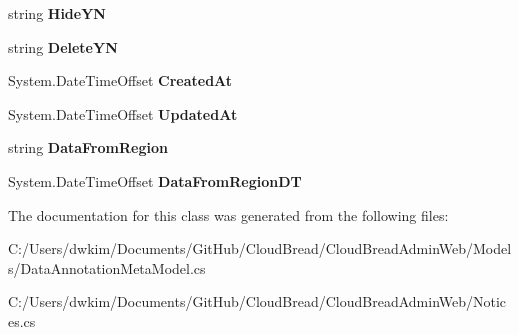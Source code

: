 \begin{DoxyCompactItemize}
\item 
string {\bfseries Hide\+YN}\hypertarget{a00168_af8b3dc1c1b42d845538dca5303f984c1}{}\label{a00168_af8b3dc1c1b42d845538dca5303f984c1}

\item 
string {\bfseries Delete\+YN}\hypertarget{a00168_a0f53b0c9e1b05d0b94e41bc536a2c6ee}{}\label{a00168_a0f53b0c9e1b05d0b94e41bc536a2c6ee}

\item 
System.\+Date\+Time\+Offset {\bfseries Created\+At}\hypertarget{a00168_ab0ebaecfed356e4ffe5c3273e348f50a}{}\label{a00168_ab0ebaecfed356e4ffe5c3273e348f50a}

\item 
System.\+Date\+Time\+Offset {\bfseries Updated\+At}\hypertarget{a00168_abc807992a04a424a9bdb722d4a222378}{}\label{a00168_abc807992a04a424a9bdb722d4a222378}

\item 
string {\bfseries Data\+From\+Region}\hypertarget{a00168_a2d4a3491ea227eb387b379e229e9a749}{}\label{a00168_a2d4a3491ea227eb387b379e229e9a749}

\item 
System.\+Date\+Time\+Offset {\bfseries Data\+From\+Region\+DT}\hypertarget{a00168_a83bd40ff691b789488961e2ce98b3e64}{}\label{a00168_a83bd40ff691b789488961e2ce98b3e64}

\end{DoxyCompactItemize}


The documentation for this class was generated from the following files\+:\begin{DoxyCompactItemize}
\item 
C\+:/\+Users/dwkim/\+Documents/\+Git\+Hub/\+Cloud\+Bread/\+Cloud\+Bread\+Admin\+Web/\+Models/Data\+Annotation\+Meta\+Model.\+cs\item 
C\+:/\+Users/dwkim/\+Documents/\+Git\+Hub/\+Cloud\+Bread/\+Cloud\+Bread\+Admin\+Web/Notices.\+cs\end{DoxyCompactItemize}
